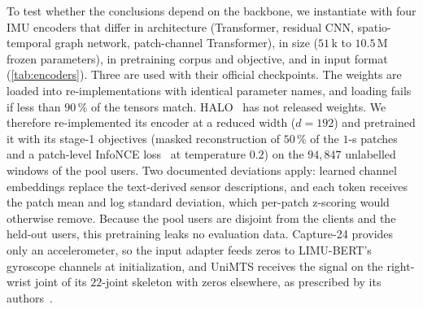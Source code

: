 To test whether the conclusions depend on the backbone, we instantiate \method{} with four IMU
encoders that differ in architecture (Transformer, residual CNN, spatio-temporal graph network,
patch-channel Transformer), in size ($51$\,k to $10.5$\,M frozen parameters), in pretraining corpus
and objective, and in input format (\cref{tab:encoders}). Three are used with their official
checkpoints. The weights are loaded into re-implementations with identical parameter names, and
loading fails if less than $90\,\%$ of the tensors match. HALO~\cite{ding2026halo} has not released
weights. We therefore re-implemented its encoder at a reduced width ($d=192$) and pretrained it with
its stage-1 objectives (masked reconstruction of $50\,\%$ of the $1$-s patches~\cite{he2022masked} and a
patch-level InfoNCE loss~\cite{oord2018representation} at temperature $0.2$) on the $94{,}847$
unlabelled windows of the pool users. Two documented deviations apply: learned channel embeddings
replace the text-derived sensor descriptions, and each token receives the patch mean and log
standard deviation, which per-patch z-scoring would otherwise remove. Because the pool users are
disjoint from the clients and the held-out users, this pretraining leaks no evaluation data.
Capture-24 provides only an accelerometer, so the input adapter feeds zeros to LIMU-BERT's gyroscope
channels at initialization, and UniMTS receives the signal on the right-wrist joint of its
$22$-joint skeleton with zeros elsewhere, as prescribed by its authors~\cite{zhang2024unimts}.

